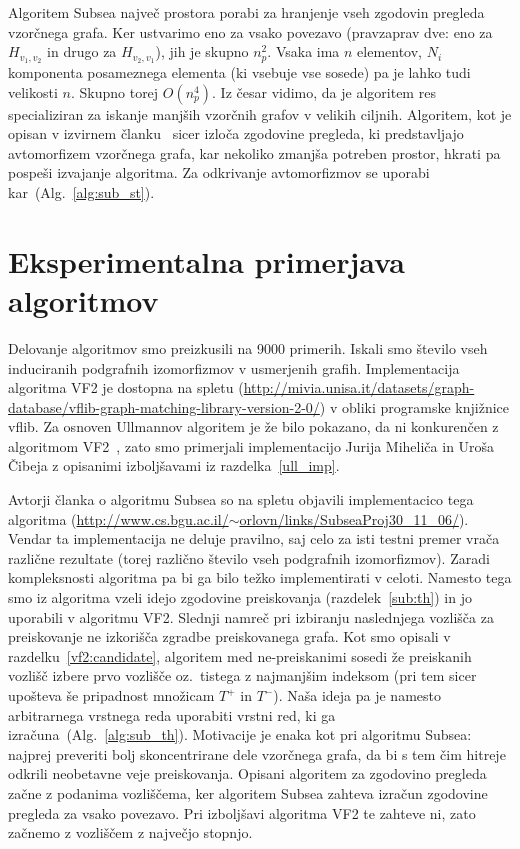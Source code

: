 \documentclass[a4paper, 12pt, ]{book}
\newcommand{\refalg}[1]{(Alg.~\ref{#1})}
\begin{document}
	Algoritem Subsea največ prostora porabi za hranjenje vseh zgodovin pregleda vzorčnega grafa. Ker ustvarimo eno za vsako povezavo (pravzaprav dve:
	eno za $H_{v_1, v_2}$ in drugo za $H_{v_2, v_1}$), jih je skupno $n_p^2$. Vsaka ima $n$ elementov, $N_i$ komponenta posameznega elementa (ki
	vsebuje vse sosede) pa je lahko tudi velikosti $n$. Skupno torej $O(n_p^4)$. Iz česar vidimo, da je algoritem res specializiran za iskanje manjših 
	vzorčnih grafov v velikih ciljnih. Algoritem, kot je opisan v izvirnem članku~\cite{subsea} sicer izloča zgodovine pregleda, ki predstavljajo avtomorfizem
	vzorčnega grafa, kar nekoliko zmanjša potreben prostor, hkrati pa pospeši izvajanje algoritma. Za odkrivanje avtomorfizmov se uporabi 
	kar~\refalg{alg:sub_st}.




\chapter{Eksperimentalna primerjava algoritmov}

	Delovanje algoritmov smo preizkusili na 9000 primerih. Iskali smo število vseh induciranih podgrafnih izomorfizmov v usmerjenih grafih. Implementacija
	algoritma VF2 je dostopna na spletu (\href{http://mivia.unisa.it/datasets/graph-database/vflib-graph-matching-library-version-2-0/}
	{http://mivia.unisa.it/datasets/graph-database/{\allowbreak}vflib-graph-matching-library-version-2-0/}) v obliki programske knjižnice vflib. Za osnoven
	Ullmannov algoritem je že bilo
	pokazano, da ni konkurenčen z algoritmom VF2~\cite{vf2_2}, zato smo primerjali implementacijo Jurija Miheliča in Uroša Čibeja z opisanimi izboljšavami
	iz razdelka~\ref{ull_imp}.

	Avtorji članka o algoritmu Subsea so na spletu objavili implementacico tega algoritma 
	(\href{http://www.cs.bgu.ac.il/~orlovn/links/SubseaProj30\_11\_06/}{http://www.cs.bgu.ac.il/$\sim$orlovn/links/SubseaProj30\_11\_06/}). Vendar ta
	implementacija ne deluje pravilno, saj celo za isti testni premer vrača različne rezultate (torej različno število vseh podgrafnih izomorfizmov). Zaradi
	kompleksnosti algoritma pa bi ga bilo težko implementirati v celoti. Namesto tega smo iz algoritma vzeli idejo zgodovine preiskovanja 
	(razdelek~\ref{sub:th}) in jo uporabili
	v algoritmu VF2. Slednji namreč pri izbiranju naslednjega vozlišča za preiskovanje ne izkorišča zgradbe preiskovanega grafa. Kot smo opisali v 
	razdelku~\ref{vf2:candidate}, algoritem med ne-preiskanimi sosedi že preiskanih vozlišč izbere prvo vozlišče oz.~tistega z najmanjšim indeksom (pri tem 
	sicer upošteva še pripadnost množicam $T^+$ in $T^-$). Naša ideja pa je namesto arbitrarnega vrstnega reda uporabiti vrstni red, ki ga 
	izračuna~\refalg{alg:sub_th}. Motivacije je enaka kot pri algoritmu Subsea: najprej preveriti bolj skoncentrirane dele vzorčnega grafa, da bi s tem čim
	hitreje odkrili neobetavne veje preiskovanja. Opisani algoritem za zgodovino pregleda začne z podanima vozliščema, ker algoritem Subsea zahteva 
	izračun zgodovine pregleda za vsako povezavo. Pri izboljšavi algoritma VF2 te zahteve ni, zato začnemo z vozliščem z največjo stopnjo.
	
\end{document}
